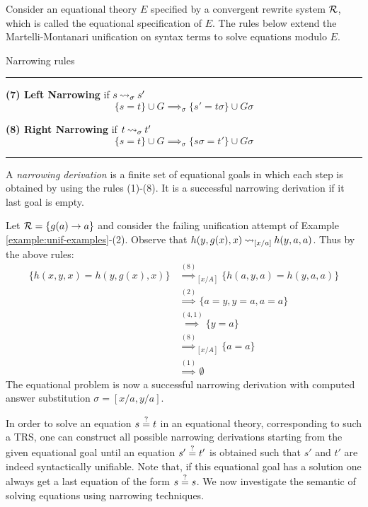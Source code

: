 Consider an equational theory $E$ specified by a convergent rewrite system $\mathcal{R}$, which is called the equational specification of $E$. The rules below extend the Martelli-Montanari unification on syntax terms to solve equations modulo $E$. \newpage
\begin{table}[ht]
	\caption{Narrowing rules}
	\label{table:narrowing_inf_rules}
	{\small
		\hrule
		\vspace{10pt}

		\textbf{(7) Left Narrowing} if $s \mathbin{\rightsquigarrow}_{\sigma} s'$
		$$\{ s = t \} \cup G \implies_{\sigma} \{ s' = t\sigma \} \cup G\sigma $$

		\textbf{(8) Right Narrowing} if $t \mathbin{\rightsquigarrow}_{\sigma} t'$
		$$\{ s = t \} \cup G \implies_{\sigma} \{ s\sigma = t' \} \cup G\sigma $$
		\hrule
	}
\end{table}

\begin{definition}
    A \textit{narrowing derivation} is a finite set of equational goals in which each step is obtained by using the rules (1)-(8). It is a successful narrowing derivation if it last goal is empty.
\end{definition}

\begin{example}
	Let $\mathcal{R} = \{ g(a) \rightarrow a \}$ and consider the failing unification attempt of Example \ref{example:unif-examples}-(2). Observe that $h(y,g(x),x) \mathbin{\rightsquigarrow}_{[x / a]} h(y,a,a)$. Thus by the above rules:
	\begin{align*}
		\{ h(x,y,x) = h(y,g(x),x) \} & \overset{(8)}{\implies}_{[x/A]} \{ h(a,y,a) = h(y,a,a) \} \\
		                             & \overset{(2)}{\implies} \{ a = y, y = a, a = a \}         \\
		                             & \overset{(4,1)}{\implies} \{ y = a\}                      \\
		                             & \overset{(8)}{\implies}_{[x/A]} \{  a = a \}              \\
		                             & \overset{(1)}{\implies} \emptyset
	\end{align*}
	The equational problem is now a successful narrowing derivation with computed answer substitution $\sigma = [x / a, y / a]$.
\end{example}

In order to solve an equation $s\overset{?}{=}t$ in an equational theory, corresponding to such a TRS, one can construct all possible narrowing derivations starting from the given equational goal until an equation $s'\overset{?}{=}t'$ is obtained such that $s'$ and $t'$ are indeed syntactically unifiable. Note that, if this equational goal has a solution one always get a last equation of the form $s\overset{?}{=}s$. We now investigate the semantic of solving equations using narrowing techniques.


